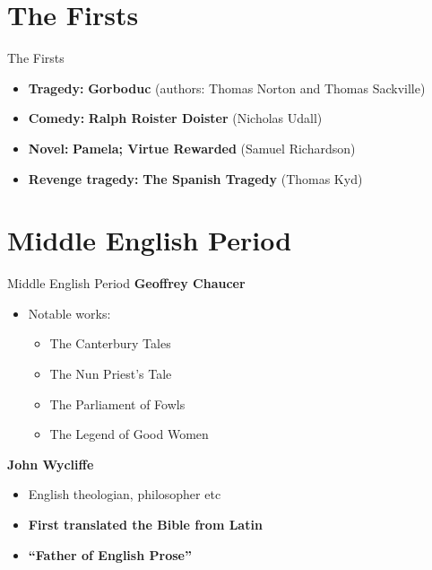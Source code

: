 \documentclass[
  12pt,
    progressbar=frametitle]{beamer}
\providecommand{\tightlist}{%
  \setlength{\itemsep}{0pt}\setlength{\parskip}{0pt}}
\begin{document}


\section{The Firsts}
\begin{frame}[allowframebreaks]
{The Firsts}
\begin{itemize}
\tightlist
\item
  \textbf{Tragedy:} \textbf{Gorboduc} (authors: Thomas Norton and Thomas
  Sackville)
\item
  \textbf{Comedy:} \textbf{Ralph Roister Doister} (Nicholas Udall)
\item
  \textbf{Novel:} \textbf{Pamela; Virtue Rewarded} (Samuel Richardson)
\item
  \textbf{Revenge tragedy:} \textbf{The Spanish Tragedy} (Thomas Kyd)
\end{itemize}
\end{frame}

\section{Middle English Period}
\begin{frame}[allowframebreaks]
{Middle English Period}
\large\textbf{Geoffrey Chaucer}\normalsize\vspace{-3mm}

\begin{itemize}
\tightlist
\item
  Notable works:

  \begin{itemize}
  \tightlist
  \item
    The Canterbury Tales
  \item
    The Nun Priest's Tale
  \item
    The Parliament of Fowls
  \item
    The Legend of Good Women
  \end{itemize}
\end{itemize}

\large\textbf{John Wycliffe}\normalsize\vspace{-3mm}

\begin{itemize}
\tightlist
\item
  English theologian, philosopher etc
\item
  \textbf{First translated the Bible from Latin}
\item
  \textbf{``Father of English Prose''}
\end{itemize}

\end{frame}
\end{document}
